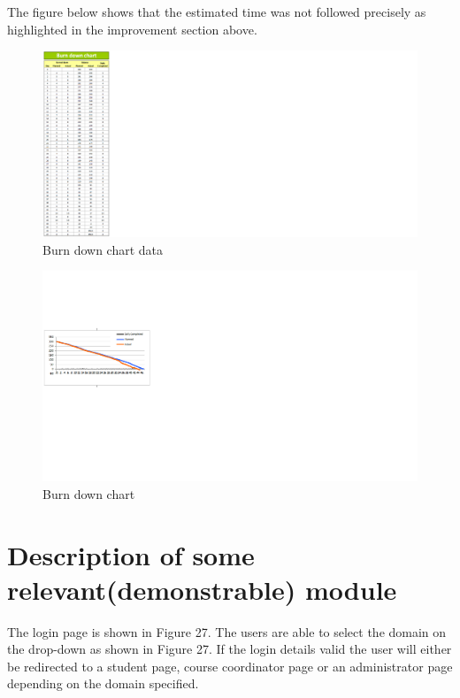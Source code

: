 \documentclass[10pt,onecolumn]{MainDocument}
\begin{document}
The figure below shows that the estimated time was not followed precisely as highlighted in the improvement section above.	
	
\begin{center}
\begin{figure}[h]
\centering
\includegraphics[trim = {0 0cm  28cm 0cm},clip, scale=0.7]{burndown1}
\caption{Burn down chart data}
\end{figure}
\end{center}

\begin{center}
\begin{figure}[h]
\centering
\includegraphics[trim = {0 8.5cm 25cm 4.5cm},clip, scale=1]{burndown}
\caption{Burn down chart}
\end{figure}
\end{center}

\clearpage
\section{Description of some relevant(demonstrable) module}

The login page is shown in Figure 27. The users are able to select the domain on the drop-down as shown in Figure 27. If the login details valid the user will either be redirected to a student page, course coordinator page or an administrator page depending on the domain specified. 
\end{document}
